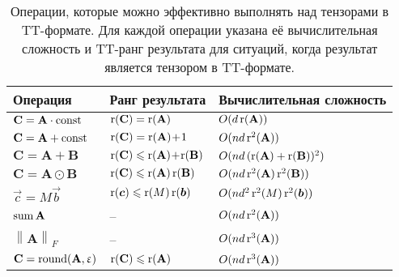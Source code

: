 \begin{table}[t]
\caption{Операции, которые можно эффективно выполнять над тензорами в TT\hyp{}формате. Для каждой операции указана её вычислительная сложность и TT\hyp{}ранг результата для ситуаций, когда результат является тензором в TT\hyp{}формате.}
\label{TT-tensor-operations}
\vskip 0.05in
\begin{center}
\begin{small}
\begin{tabular}{l@{\;\;}l@{\;\;}l}
\hline
Операция & Ранг результата & Вычислительная сложность \\
\hline
$\mathbf{C} = \mathbf{A} \cdot \operatorname{const}$      & $\operatorname{r}(\mathbf{C}) = \operatorname{r}(\mathbf{A})$             & $O(d  \operatorname{r}(\mathbf{A}))$\\
$\mathbf{C} = \mathbf{A} + \operatorname{const}$          & $\operatorname{r}(\mathbf{C}) = \operatorname{r}(\mathbf{A})\!+\!1$         & $O(n  d  \operatorname{r}^2(\mathbf{A}))$\\
$\mathbf{C} = \mathbf{A} + \mathbf{B}$           & $\operatorname{r}(\mathbf{C}) \leqslant \operatorname{r}(\mathbf{A})\!+\!\operatorname{r}(\mathbf{B})$       & $O(n  d \, (\operatorname{r}(\mathbf{A}) + \operatorname{r}(\mathbf{B}))^2)$\\
$\mathbf{C} = \mathbf{A} \odot \mathbf{B}$       & $\operatorname{r}(\mathbf{C}) \leqslant \operatorname{r}(\mathbf{A})  \operatorname{r}(\mathbf{B})$   & $O(n  d  \operatorname{r}^2(\mathbf{A})  \operatorname{r}^2(\mathbf{B}))$\\
$\vec{c}=M\vec{b}$                          & $\operatorname{r}(\boldsymbol{c}) \leqslant \operatorname{r}(M) \operatorname{r}(\boldsymbol{b})$       & $O(n d^2 \operatorname{r}^2(M) \operatorname{r}^2(\boldsymbol{b}))$\\
$\operatorname{sum} \mathbf{A}$                & --                      & $O(n  d  \operatorname{r}^2(\mathbf{A}))$\\
$\left \| \mathbf{A} \right \|_F$       & --                      & $O(n  d  \operatorname{r}^3(\mathbf{A}))$\\
$\mathbf{C} = \operatorname{round}(\mathbf{A}, \upvarepsilon)$ & $\operatorname{r}(\mathbf{C}) \leqslant \operatorname{r}(\mathbf{A})$          & $O(n d \operatorname{r}^3(\mathbf{A}))$\\
\hline
\end{tabular}
\end{small}
\end{center}
\vskip -0.1in
\end{table}


